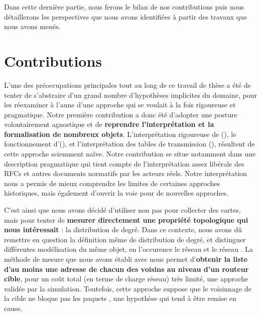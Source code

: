 \label{chap:conclusion}
\introformatting

Dans cette dernière partie, nous ferons le bilan de nos contributions puis nous
détaillerons les perspectives que nous avons identifiées à partir des travaux
que nous avons menés.

\section{Contributions}
\label{sec:conclusion-contribs}

L'une des préoccupations principales tout au long de ce travail de thèse a été
de tenter de s'abstraire d'un grand nombre d'hypothèses implicites du domaine,
pour les réexaminer à l'aune d'une approche qui se voulait à la fois rigoureuse
et pragmatique. Notre première contribution a donc été d'adopter une posture
volontairement agnostique et de {\bf reprendre l'interprétation et la
formalisation de nombreux objets}. L'interprétation rigoureuse de \traceroute
(), le fonctionnement d'\udpping (), et
l'interprétation des tables de transmission (), résultent de
cette approche sciemment naïve. Notre contribution se situe notamment dans une
description pragmatique qui tient compte de l'interprétation assez libérale des
RFCs et autres documents normatifs par les acteurs réels. Notre interprétation
nous a permis de mieux comprendre les limites de certaines approches
historiques, mais également d'ouvrir la voie pour de nouvelles approches.

C'est ainsi que nous avons décidé d'utiliser \traceroute non pas pour collecter
des cartes, mais pour tenter de {\bf mesurer directement une propriété
topologique qui nous intéressait} : la distribution de degré. Dans ce contexte,
nous avons dû remettre en question la définition même de distribution de degré,
et distinguer différentes modélisation du même objet, en l'occurence le réseau
\LL et le réseau \LLL. La méthode de mesure que nous avons établi avec
\traceroute nous permet d'{\bf obtenir la liste d'au moins une adresse de chacun
des voisins au niveau \LLL d'un routeur cible}, pour un coût total (en terme de
charge réseau) très limité, une approche validée par la simulation.
Toutefois, cette approche suppose que le voisinnage de la cible ne bloque pas
les paquets \icmp, une hypothèse qui tend à être remise en cause.

